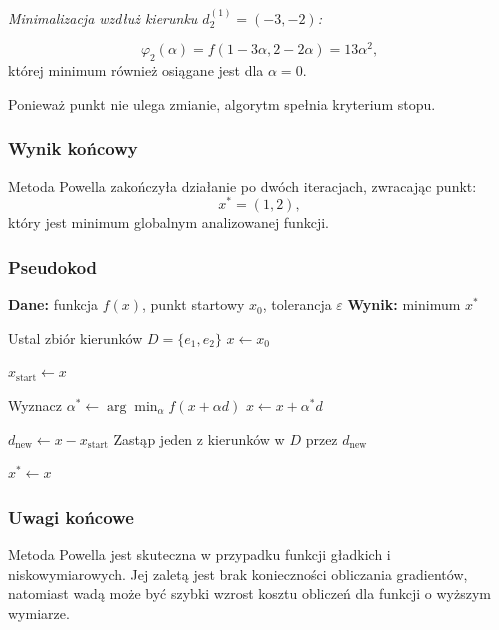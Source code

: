 \documentclass[10pt,a4paper]{article}
\begin{document}
\emph{Minimalizacja wzdłuż kierunku $d_2^{(1)}=(-3,-2)$:}

\[
\varphi_2(\alpha) = f(1-3\alpha, 2-2\alpha)
= 13\alpha^2,
\]
której minimum również osiągane jest dla $\alpha = 0$.

Ponieważ punkt nie ulega zmianie, algorytm spełnia kryterium stopu.



\subsubsection{Wynik końcowy}

Metoda Powella zakończyła działanie po dwóch iteracjach,
zwracając punkt:
\[
x^* = (1,2),
\]
który jest minimum globalnym analizowanej funkcji.



\subsubsection{Pseudokod}

\begin{algorithm}[H]
\caption{Metoda Powella (bezpochodna, z przeszukiwaniem liniowym)}
\begin{algorithmic}[1]
\STATE \textbf{Dane:} funkcja $f(x)$, punkt startowy $x_0$, tolerancja $\varepsilon$
\STATE \textbf{Wynik:} minimum $x^\ast$

\STATE Ustal zbiór kierunków $D = \{e_1, e_2\}$
\STATE $x \leftarrow x_0$

    \STATE $x_{\text{start}} \leftarrow x$

        \STATE Wyznacz
        \STATE \hspace{0.5cm} $\alpha^\ast \leftarrow \arg\min_{\alpha} f(x + \alpha d)$
        \STATE $x \leftarrow x + \alpha^\ast d$
    \ENDFOR

    \STATE $d_{\text{new}} \leftarrow x - x_{\text{start}}$
    \STATE Zastąp jeden z kierunków w $D$ przez $d_{\text{new}}$
\ENDWHILE

\STATE $x^\ast \leftarrow x$
\end{algorithmic}
\end{algorithm}


\subsubsection{Uwagi końcowe}

Metoda Powella jest skuteczna w przypadku funkcji gładkich i
niskowymiarowych. Jej zaletą jest brak konieczności obliczania
gradientów, natomiast wadą może być szybki wzrost kosztu obliczeń
dla funkcji o wyższym wymiarze.
\end{document}
